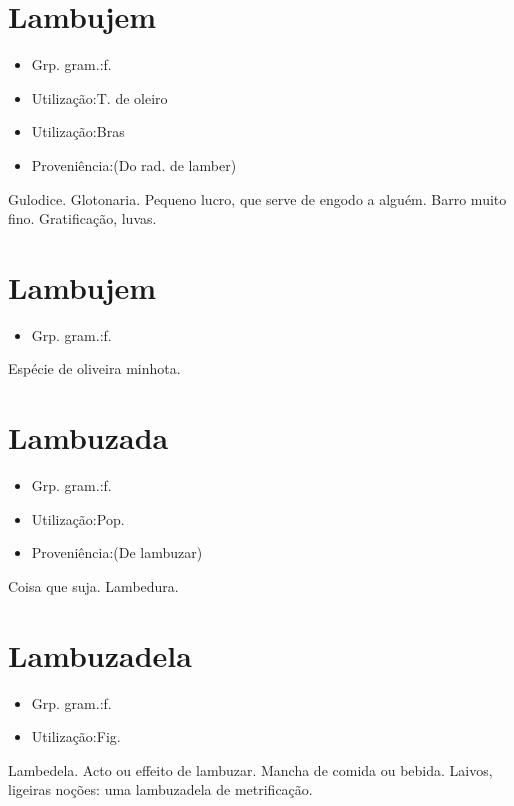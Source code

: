 \section{Lambujem}
\begin{itemize}
\item {Grp. gram.:f.}
\end{itemize}
\begin{itemize}
\item {Utilização:T. de oleiro}
\end{itemize}
\begin{itemize}
\item {Utilização:Bras}
\end{itemize}
\begin{itemize}
\item {Proveniência:(Do rad. de \textunderscore lamber\textunderscore )}
\end{itemize}
Gulodice.
Glotonaria.
Pequeno lucro, que serve de engodo a alguém.
Barro muito fino.
Gratificação, luvas.
\section{Lambujem}
\begin{itemize}
\item {Grp. gram.:f.}
\end{itemize}
Espécie de oliveira minhota.
\section{Lambuzada}
\begin{itemize}
\item {Grp. gram.:f.}
\end{itemize}
\begin{itemize}
\item {Utilização:Pop.}
\end{itemize}
\begin{itemize}
\item {Proveniência:(De \textunderscore lambuzar\textunderscore )}
\end{itemize}
Coisa que suja.
Lambedura.
\section{Lambuzadela}
\begin{itemize}
\item {Grp. gram.:f.}
\end{itemize}
\begin{itemize}
\item {Utilização:Fig.}
\end{itemize}
Lambedela.
Acto ou effeito de lambuzar.
Mancha de comida ou bebida.
Laivos, ligeiras noções: \textunderscore uma lambuzadela de metrificação\textunderscore .
